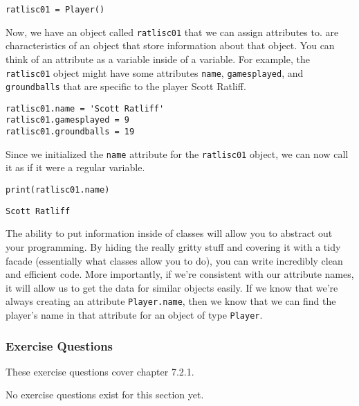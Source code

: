 \begin{lstlisting}[style=pippython]
ratlisc01 = Player()
\end{lstlisting}
Now, we have an object called \verb|ratlisc01| that we can assign attributes to.  are characteristics of an object that store information about that object. You can think of an attribute as a variable inside of a variable. For example, the \verb|ratlisc01| object might have some attributes \verb|name|, \verb|gamesplayed|, and \verb|groundballs| that are specific to the player Scott Ratliff.
\begin{lstlisting}[style=pippython]
ratlisc01.name = 'Scott Ratliff'
ratlisc01.gamesplayed = 9
ratlisc01.groundballs = 19
\end{lstlisting}
Since we initialized the \verb|name| attribute for the \verb|ratlisc01| object, we can now call it as if it were a regular variable.
\begin{lstlisting}[style=pippython]
print(ratlisc01.name)
\end{lstlisting}
\begin{lstlisting}[style=pippython]
Scott Ratliff
\end{lstlisting}
The ability to put information inside of classes will allow you to abstract out your programming. By hiding the really gritty stuff and covering it with a tidy facade (essentially what classes allow you to do), you can write incredibly clean and efficient code. More importantly, if we're consistent with our attribute names, it will allow us to get the data for similar objects easily. If we know that we're always creating an attribute \verb|Player.name|, then we know that we can find the player's name in that attribute for an object of type \verb|Player|.
\subsubsection*{Exercise Questions}
These exercise questions cover chapter 7.2.1.

No exercise questions exist for this section yet.
